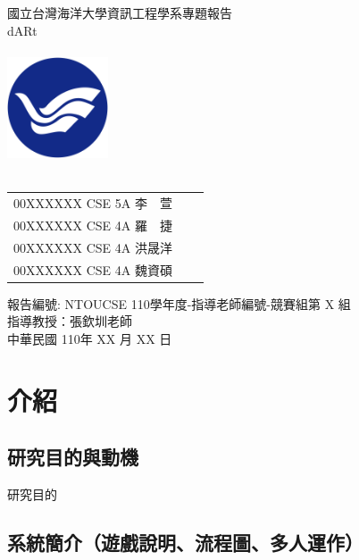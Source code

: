 \documentclass[12pt, a4paper]{report}
\begin{document}
\begin{titlepage}
    \linespread{2} %
    \centering
    \Large 國立台灣海洋大學資訊工程學系專題報告\\
    \LARGE dARt \\
    \ \\
    \includegraphics[width=3cm]{NTOU-school-badge}\\
    \ \\
    \linespread{1}
    \begin{table}[h]
        \large
        \centering
        \begin{tabular}{lll}
            00XXXXXX CSE 5A 李　萱 \\
            00XXXXXX CSE 4A 羅　捷 \\
            00XXXXXX CSE 4A 洪晟洋 \\
            00XXXXXX CSE 4A 魏資碩 \\
        \end{tabular}
    \end{table}

    \large 報告編號: NTOUCSE 110學年度-指導老師編號-競賽組第 X 組 \\
    \large 指導教授：張欽圳老師\ \\
    \vspace{3cm}
    \large 中華民國 110年 XX 月 XX 日

\end{titlepage}

\tableofcontents %

\chapter{介紹}
\section{研究目的與動機}

    研究目的

\section{系統簡介（遊戲說明、流程圖、多人運作）}
\end{document}
